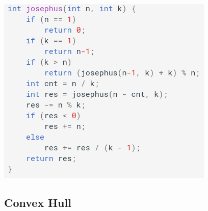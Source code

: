 \documentclass[11pt,twocolumn]{article}
\begin{document}
\includegraphics[scale=0.5]{quickjosephus}

\subsection{Convex Hull}
\end{document}
